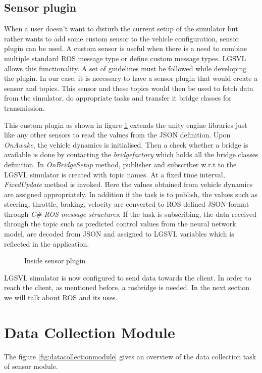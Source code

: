 \subsection{Sensor plugin}
When a user doesn't want to disturb the current setup of the simulator but rather wants to add
some custom sensor to the vehicle configuration, sensor plugin can be used.  A custom sensor is useful when there is a need to combine multiple standard ROS
message type or define custom message types. LGSVL allows this functionality. A set of guidelines must be followed while developing the plugin. In our case,
it is necessary to have a sensor plugin that would create a sensor and topics. This sensor
and these topics would then be used to fetch data from the simulator, do appropriate tasks and transfer it
bridge classes for transmission.

This custom plugin as shown in figure \ref{fig:lgsvlsensorplugin} extends the unity engine libraries just like
any other sensors to read the values from the JSON definition. Upon \textit{OnAwake}, the
vehicle dynamics is initialised. Then a check whether a bridge is available is done by
contacting the \textit{bridgefactory} which holds all the bridge classes definition. In
\textit{OnBridgeSetup} method, publisher and subscriber w.r.t to the LGSVL simulator is
created with topic names. At a fixed time interval, \textit{FixedUpdate} method is invoked.
Here the values obtained from vehicle dynamics are assigned appropriately. In addition if
the task is to publish, the values such as steering, throttle, braking, velocity are
converted to ROS defined JSON format through \textit{C\# ROS message structures}.
If the task is subscribing, the data received through the topic such as predicted control values from the
neural network model, are decoded from JSON and assigned to LGSVL variables which is reflected in the application.

\begin{figure}
	\centering
    \def\svgwidth{0.8\textwidth}
    \caption{Inside sensor plugin}
    \label{fig:lgsvlsensorplugin}
\end{figure}
LGSVL simulator is now configured to send data towards the client. In order to reach the
client, as mentioned before, a rosbridge is needed. In the next section we will talk
about ROS and its uses.

\section{Data Collection Module}
The figure \ref{fig:datacollectionmodule} gives an overview of the data collection task of
sensor module.

